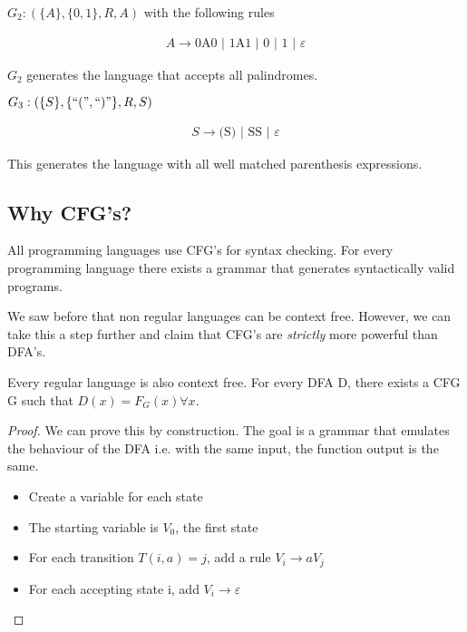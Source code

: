 \begin{example}
    $G_2: (\{A\}, \{0, 1\}, R, A)$ with the following rules

    \begin{gather*}
        A \rightarrow \text{0A0 | 1A1 | 0 | 1 | }\varepsilon
    \end{gather*}

    $G_2$ generates the language that accepts all palindromes. 
\end{example}

\begin{example}
    $G_3: (\{S\}, \{``(",``)"\}, R, S)$

    \begin{gather*}
        S \rightarrow \text{(S) | SS | } \varepsilon 
    \end{gather*}

    This generates the language with all well matched parenthesis expressions.
\end{example}

\subsection*{Why CFG's?}
All programming languages use CFG's for syntax checking. For every programming language there exists a grammar that generates syntactically valid programs.

We saw before that non regular languages can be context free. However, we can take this a step further and claim that CFG's are \emph{strictly} more powerful than DFA's.

\begin{theorem}
    
    Every regular language is also context free. For every DFA D, there exists a CFG G such that $D(x) = F_G(x) \forall x$.
\end{theorem}

\begin{proof}
    
    We can prove this by construction. The goal is a grammar that emulates the behaviour of the DFA i.e. with the same input, the function output is the same.
    \begin{itemize}
        \item Create a variable for each state
        \item The starting variable is $V_0$, the first state
        \item For each transition $T(i, a) = j$, add a rule $V_i \rightarrow aV_j$
        \item For each accepting state i, add $V_i \rightarrow \varepsilon$
    \end{itemize}
\end{proof}

